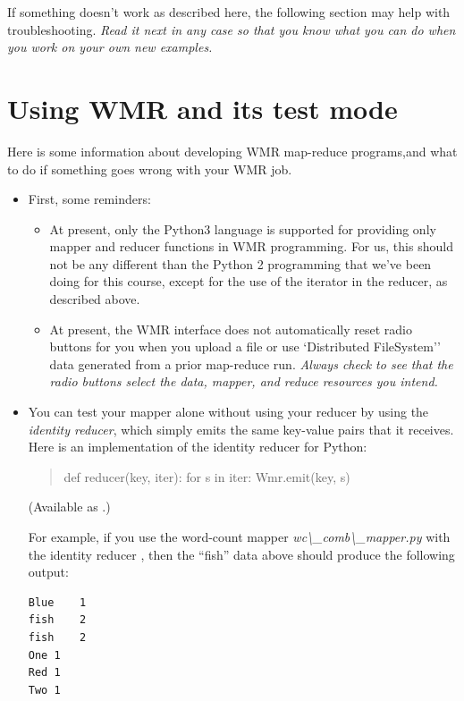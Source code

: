 \documentclass[letterpaper,10pt,openany,oneside]{sphinxmanual}
\begin{document}
If something doesn't work as described here, the following section
may help with troubleshooting. \emph{Read it next in any case so that you
know what you can do when you work on your own new examples.}


\section{Using WMR and its test mode}
\label{wmr_py/wmr_py:using-wmr-and-its-test-mode}
Here is some information about developing WMR map-reduce
programs,and what to do if something goes wrong with your WMR job.
\begin{itemize}
\item {} 
First, some reminders:
\begin{itemize}
\item {} 
At present, only the Python3 language is supported for providing
only mapper and reducer functions in WMR programming. For us, this
should not be any different than the Python 2 programming that
we've been doing for this course, except for the use of the
iterator in the reducer, as described above.

\item {} 
At present, the WMR interface does not automatically reset radio
buttons for you when you upload a file or use {}`Distributed
FileSystem'' data generated from a prior map-reduce run.
\emph{Always check to see that the radio buttons select the data, mapper, and reduce resources you intend.}

\end{itemize}

\item {} 
You can test your mapper alone without using your reducer by
using the \emph{identity reducer}, which simply emits the same key-value
pairs that it receives. Here is an implementation of the identity
reducer for Python:
\begin{quote}

def reducer(key, iter): for s in iter: Wmr.emit(key, s)
\end{quote}

(Available as .)

For example, if you use the word-count mapper
\emph{wc\textbackslash{}\_comb\textbackslash{}\_mapper.py} with the identity reducer
, then the ``fish'' data above should produce the
following output:

\begin{Verbatim}[commandchars=\\\{\}]
Blue    1
fish    2
fish    2
One 1
Red 1
Two 1
\end{Verbatim}


\end{itemize}
\end{document}
